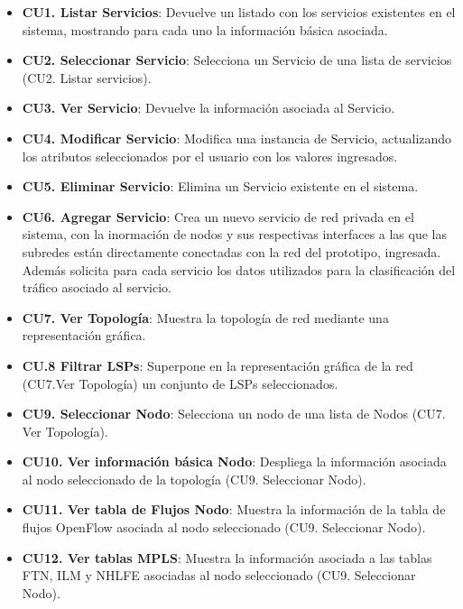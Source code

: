 \begin{itemize}
\item \textbf{CU1. Listar Servicios}: Devuelve un listado con los servicios existentes en el sistema, mostrando para cada uno la informaci\'on b\'asica asociada.

\item \textbf{CU2. Seleccionar Servicio}: Selecciona un Servicio de una lista de servicios (CU2. Listar servicios).

\item \textbf{CU3. Ver Servicio}: Devuelve la informaci\'on asociada al Servicio.

\item \textbf{CU4. Modificar Servicio}: Modifica una instancia de Servicio, actualizando los atributos seleccionados por el usuario con los valores ingresados.
 								
\item \textbf{CU5. Eliminar Servicio}: Elimina un Servicio existente en el sistema.

\item \textbf{CU6. Agregar Servicio}: Crea un nuevo servicio de red privada en el sistema, con la inormaci\'on de nodos y sus respectivas interfaces a las que las subredes est\'an directamente conectadas con la red del prototipo, ingresada. Adem\'as solicita para cada servicio los datos utilizados para la clasificaci\'on del tr\'afico asociado al servicio. 

\item \textbf{CU7. Ver Topolog\'ia}: Muestra la topolog\'ia de red mediante una representaci\'on gr\'afica.

\item \textbf{CU.8 Filtrar LSPs}: Superpone en la representaci\'on gr\'afica de la red (CU7.Ver Topolog\'ia) un conjunto de LSPs seleccionados.

\item \textbf{CU9. Seleccionar Nodo}: Selecciona un nodo de una lista de Nodos (CU7. Ver Topolog\'ia).

\item \textbf{CU10. Ver informaci\'on b\'asica Nodo}: Despliega la informaci\'on asociada al nodo seleccionado de la topolog\'ia (CU9. Seleccionar Nodo).

\item \textbf{CU11. Ver tabla de Flujos Nodo}: Muestra la informaci\'on de la tabla de flujos OpenFlow asociada al nodo seleccionado (CU9. Seleccionar Nodo).

\item \textbf{CU12. Ver tablas MPLS}: Muestra la informaci\'on asociada a las tablas FTN, ILM y NHLFE asociadas al nodo seleccionado (CU9. Seleccionar Nodo).


\end{itemize}
